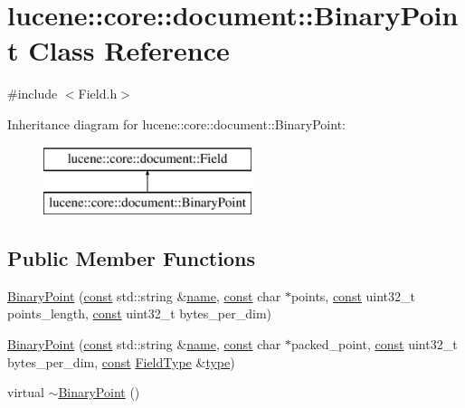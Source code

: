 \hypertarget{classlucene_1_1core_1_1document_1_1BinaryPoint}{}\section{lucene\+:\+:core\+:\+:document\+:\+:Binary\+Point Class Reference}
\label{classlucene_1_1core_1_1document_1_1BinaryPoint}


{\ttfamily \#include $<$Field.\+h$>$}

Inheritance diagram for lucene\+:\+:core\+:\+:document\+:\+:Binary\+Point\+:\begin{figure}[H]
\begin{center}
\leavevmode
\includegraphics[height=2.000000cm]{classlucene_1_1core_1_1document_1_1BinaryPoint}
\end{center}
\end{figure}
\subsection*{Public Member Functions}
\begin{DoxyCompactItemize}
\item 
\mbox{\hyperlink{classlucene_1_1core_1_1document_1_1BinaryPoint_acd524392b16aaeaa05120e87a79e487f}{Binary\+Point}} (\mbox{\hyperlink{ZlibCrc32_8h_a2c212835823e3c54a8ab6d95c652660e}{const}} std\+::string \&\mbox{\hyperlink{classlucene_1_1core_1_1document_1_1Field_a52f673f3b3abb14b180f5159f4726537}{name}}, \mbox{\hyperlink{ZlibCrc32_8h_a2c212835823e3c54a8ab6d95c652660e}{const}} char $\ast$points, \mbox{\hyperlink{ZlibCrc32_8h_a2c212835823e3c54a8ab6d95c652660e}{const}} uint32\+\_\+t points\+\_\+length, \mbox{\hyperlink{ZlibCrc32_8h_a2c212835823e3c54a8ab6d95c652660e}{const}} uint32\+\_\+t bytes\+\_\+per\+\_\+dim)
\item 
\mbox{\hyperlink{classlucene_1_1core_1_1document_1_1BinaryPoint_a8eea62d212ffd7385f3e6a6f0ca6c482}{Binary\+Point}} (\mbox{\hyperlink{ZlibCrc32_8h_a2c212835823e3c54a8ab6d95c652660e}{const}} std\+::string \&\mbox{\hyperlink{classlucene_1_1core_1_1document_1_1Field_a52f673f3b3abb14b180f5159f4726537}{name}}, \mbox{\hyperlink{ZlibCrc32_8h_a2c212835823e3c54a8ab6d95c652660e}{const}} char $\ast$packed\+\_\+point, \mbox{\hyperlink{ZlibCrc32_8h_a2c212835823e3c54a8ab6d95c652660e}{const}} uint32\+\_\+t bytes\+\_\+per\+\_\+dim, \mbox{\hyperlink{ZlibCrc32_8h_a2c212835823e3c54a8ab6d95c652660e}{const}} \mbox{\hyperlink{classlucene_1_1core_1_1document_1_1FieldType}{Field\+Type}} \&\mbox{\hyperlink{classlucene_1_1core_1_1document_1_1Field_a7d5849d933ebde73422710069643ccff}{type}})
\item 
virtual \mbox{\hyperlink{classlucene_1_1core_1_1document_1_1BinaryPoint_a5825353f88fb9f50e0e918dd87453b1b}{$\sim$\+Binary\+Point}} ()
\end{DoxyCompactItemize}

